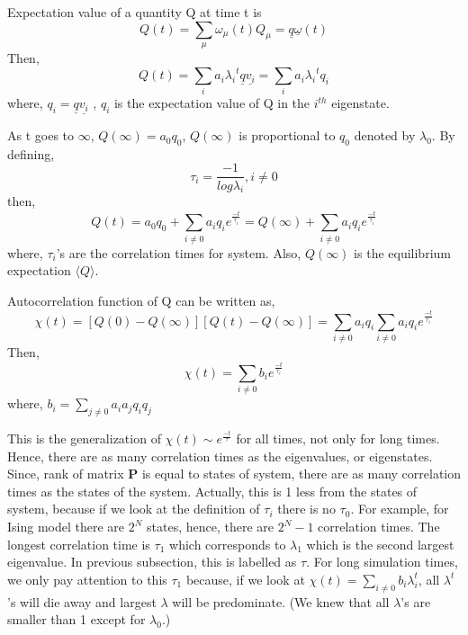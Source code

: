 \documentclass[12pt,fleqn]{report}
\begin{document}
Expectation value of a quantity Q at time t is 
\begin{equation}
Q(t) = \sum\limits_{\mu} \omega_\mu (t) Q_\mu = \underline{q} \underline{\omega}(t)
\end{equation}
Then,
\begin{equation}
Q(t) = \sum\limits_{i} a_i {\lambda_i}^t \underline{q} \underline{v_i} = \sum\limits_{i} a_i {\lambda_i}^t q_i
\end{equation}
where, $q_i = \underline{q} \underline{v_i}$ , $q_i$ is the expectation value of Q in the $i^{th}$ eigenstate.

As t goes to $\infty$, $ Q(\infty)  = a_0 q_0$, $Q(\infty)  $ is proportional to $q_0$ denoted by $\lambda_0$. By defining,
\begin{equation}
\tau_i = \frac{-1}{log \lambda_i} ,  i \neq 0
\end{equation}
then,
\begin{equation}
Q(t) = a_0 q_0 + \sum\limits_{i \neq 0 } a_i q_i e^{\frac{-t}{\tau_i}} = Q(\infty) +\sum\limits_{i \neq 0 } a_i q_i e^{\frac{-t}{\tau_i}}
\end{equation}
where, $\tau_i$'s are the correlation times for system. Also, $Q(\infty)$ is the equilibrium expectation $\langle Q\rangle$.

Autocorrelation function of Q can be written as,
\begin{equation}
\chi (t) = [Q(0) - Q(\infty)][Q(t) - Q(\infty)] = \sum\limits_{i \neq 0} a_i q_i \sum\limits_{i \neq 0} a_i q_i e^{\frac{-t}{\tau_i}}
\end{equation}
Then,
\begin{equation}
\chi (t) = \sum\limits_{i \neq 0} b_i e^{\frac{-t}{\tau_i}}
\end{equation}
where, $b_i = \sum\limits_{j \neq 0 } a_i a_j q_i q_j$

This is the generalization of $\chi (t) \sim e^{\frac{-t}{\tau}}$ for all times, not only for long times. Hence, there are as many correlation times as the eigenvalues, or eigenstates.  Since, rank of matrix \textbf{P} is equal to states of system, there are as many correlation times as the states of the system. Actually, this is 1 less from the states of system, because if we look at the definition of $\tau_i$ there is no $\tau_0$. For example, for Ising model there are $2^N$ states, hence, there are $2^N - 1 $ correlation times. The longest correlation time is $\tau_1$ which corresponds to $\lambda_1$ which is the second largest eigenvalue. In previous subsection, this is labelled as $\tau$. For long simulation times, we only pay attention to this $\tau_1$ because, if we look at $ \chi (t) = \sum\limits_{i \neq 0} b_i \lambda_i^t$, all $\lambda^t$'s will die away and largest $\lambda$ will be predominate. (We knew that all $\lambda$'s are smaller than 1 except for $\lambda_0$.)
\end{document}
